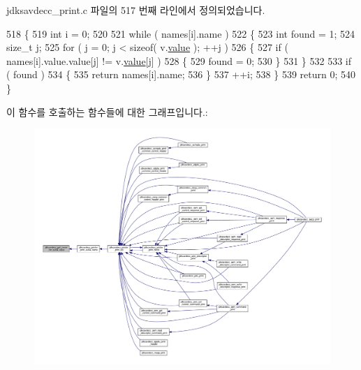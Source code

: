 jdksavdecc\+\_\+print.\+c 파일의 517 번째 라인에서 정의되었습니다.


\begin{DoxyCode}
518 \{
519     \textcolor{keywordtype}{int} i = 0;
520 
521     \textcolor{keywordflow}{while} ( names[i].name )
522     \{
523         \textcolor{keywordtype}{int} found = 1;
524         \textcolor{keywordtype}{size\_t} j;
525         \textcolor{keywordflow}{for} ( j = 0; j < \textcolor{keyword}{sizeof}( v.\hyperlink{structjdksavdecc__eui64_ac7a8beb4da4fc8eb8acfec13711a134f}{value} ); ++j )
526         \{
527             \textcolor{keywordflow}{if} ( names[i].value.value[j] != v.\hyperlink{structjdksavdecc__eui64_ac7a8beb4da4fc8eb8acfec13711a134f}{value}[j] )
528             \{
529                 found = 0;
530             \}
531         \}
532 
533         \textcolor{keywordflow}{if} ( found )
534         \{
535             \textcolor{keywordflow}{return} names[i].name;
536         \}
537         ++i;
538     \}
539     \textcolor{keywordflow}{return} 0;
540 \}
\end{DoxyCode}


이 함수를 호출하는 함수들에 대한 그래프입니다.\+:
\nopagebreak
\begin{figure}[H]
\begin{center}
\leavevmode
\includegraphics[width=350pt]{group__util_gaaae54dbec3243caca35c0a17e9427754_icgraph}
\end{center}
\end{figure}


